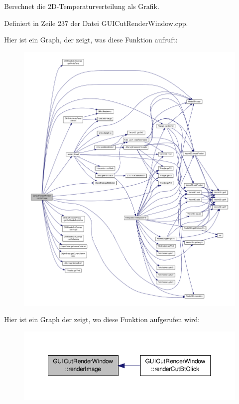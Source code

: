 Berechnet die 2\-D-\/\-Temperaturverteilung als Grafik. 



Definiert in Zeile 237 der Datei G\-U\-I\-Cut\-Render\-Window.\-cpp.



Hier ist ein Graph, der zeigt, was diese Funktion aufruft\-:\nopagebreak
\begin{figure}[H]
\begin{center}
\leavevmode
\includegraphics[width=350pt]{classGUICutRenderWindow_a9eedb7088ad31f4680a77ed3a06fa60c_cgraph}
\end{center}
\end{figure}




Hier ist ein Graph der zeigt, wo diese Funktion aufgerufen wird\-:\nopagebreak
\begin{figure}[H]
\begin{center}
\leavevmode
\includegraphics[width=350pt]{classGUICutRenderWindow_a9eedb7088ad31f4680a77ed3a06fa60c_icgraph}
\end{center}
\end{figure}




